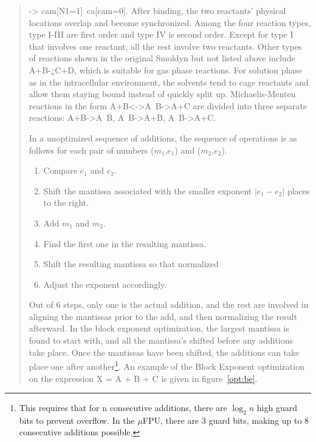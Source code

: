 \begin{quote}
-> cam[N1=1]~ca[cam=0].
After binding, the two reactants’ physical locations overlap and become synchronized.
Among the four reaction types, type I-III are first order and type IV is second order. Except for
type I that involves one reactant, all the rest involve two reactants. Other types of reactions
shown in the original Smoldyn but not listed above include A+B-¿C+D, which is suitable for
gas phase reactions. For solution phase as in the intracellular environment, the solvents tend to
cage reactants and allow them staying bound instead of quickly split up. Michaelis-Menten
reactions in the form A+B<->A~B->A+C are divided into three separate reactions:
A+B->A~B, A~B->A+B, A~B->A+C.




In a unoptimized sequence of additions, the sequence of operations is as
follows for each pair of numbers ($m_1$,$e_1$) and ($m_2$,$e_2$).
\begin{enumerate}
  \item Compare $e_1$ and $e_2$.
  \item Shift the mantissa associated with the smaller exponent $|e_1-e_2|$
        places to the right.
  \item Add $m_1$ and $m_2$.
  \item Find the first one in the resulting mantissa.
  \item Shift the resulting mantissa so that normalized
  \item Adjust the exponent accordingly.
\end{enumerate}

Out of 6 steps, only one is the actual addition, and the rest are involved
in aligning the mantissas prior to the add, and then normalizing the result
afterward.  In the block exponent optimization, the largest mantissa is
found to start with, and all the mantissa's shifted before any additions
take place.  Once the mantissas have been shifted, the additions can take
place one after another\footnote{This requires that for n consecutive
additions, there are $\log_{2}n$ high guard bits to prevent overflow.  In
the $\mu$FPU, there are 3 guard bits, making up to 8 consecutive additions
possible.}.  An example of the Block Exponent optimization on the expression
X = A + B + C is given in figure~\ref{opt:be}.

%


\end{quote}
